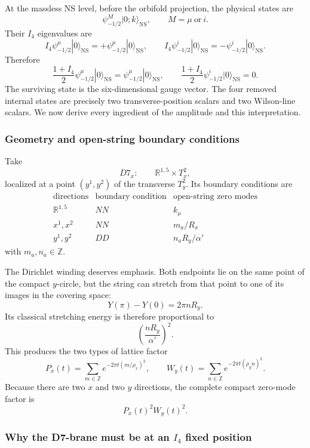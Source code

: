 \documentclass[
  10pt,
  a4paper,
  openany]{book}
\begin{document}
At the massless NS level, before the orbifold projection, the physical
states are \[
\psi_{-1/2}^{M}|0;k\rangle_{\mathrm{NS}},
\qquad
M=\mu\ \text{or}\ i.
\] Their \(I_4\) eigenvalues are \[
I_4\psi_{-1/2}^{\mu}|0\rangle_{\mathrm{NS}}
=
+\psi_{-1/2}^{\mu}|0\rangle_{\mathrm{NS}},
\qquad
I_4\psi_{-1/2}^{i}|0\rangle_{\mathrm{NS}}
=
-\psi_{-1/2}^{i}|0\rangle_{\mathrm{NS}}.
\] Therefore \[
\frac{1+I_4}{2}
\psi_{-1/2}^{\mu}|0\rangle_{\mathrm{NS}}
=
\psi_{-1/2}^{\mu}|0\rangle_{\mathrm{NS}},
\qquad
\frac{1+I_4}{2}
\psi_{-1/2}^{i}|0\rangle_{\mathrm{NS}}
=
0.
\] The surviving state is the six-dimensional gauge vector. The four
removed internal states are precisely two transverse-position scalars
and two Wilson-line scalars. We now derive every ingredient of the
amplitude and this interpretation.

\subsubsection{Geometry and open-string boundary
conditions}\label{geometry-and-open-string-boundary-conditions}

Take \[
D7_x:
\qquad
\mathbb R^{1,5}\times T_x^2,
\] localized at a point \((y^1,y^2)\) of the transverse \(T_y^2\). Its
boundary conditions are \[
\begin{array}{c|c|c}
\text{directions}
&\text{boundary condition}
&\text{open-string zero modes}\\ \hline
\mathbb R^{1,5}
&NN
&k_\mu\\
x^1,x^2
&NN
&m_a/R_x\\
y^1,y^2
&DD
&n_aR_y/\alpha'
\end{array}
\] with \(m_a,n_a\in\mathbb Z\).

The Dirichlet winding deserves emphasis. Both endpoints lie on the same
point of the compact \(y\)-circle, but the string can stretch from that
point to one of its images in the covering space: \[
Y(\pi)-Y(0)
=
2\pi nR_y.
\] Its classical stretching energy is therefore proportional to \[
\left(\frac{nR_y}{\alpha'}\right)^2.
\] This produces the two types of lattice factor \[
P_x(t)
=
\sum_{m\in\mathbb Z}
e^{-2\pi t(m/\rho_x)^2},
\qquad
W_y(t)
=
\sum_{n\in\mathbb Z}
e^{-2\pi t(\rho_y n)^2}.
\] Because there are two \(x\) and two \(y\) directions, the complete
compact zero-mode factor is \[
P_x(t)^2W_y(t)^2.
\]

\subsubsection{\texorpdfstring{Why the D7-brane must be at an \(I_4\)
fixed
position}{Why the D7-brane must be at an I\_4 fixed position}}\label{why-the-d7-brane-must-be-at-an-i_4-fixed-position}
\end{document}
